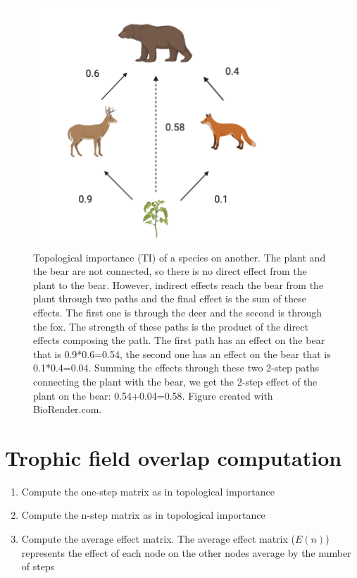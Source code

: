 \documentclass[twocolumn]{article}
\begin{document}
\begin{appendices}
\begin{enumerate}
								\begin{figure}[htbp]%
									\centering
									\includegraphics[width=1.0\linewidth]{TI_example.png}
									\caption{Topological importance (TI) of a species on another. The plant and the bear are not connected, so there is no direct effect from the plant to the bear. However, indirect effects reach the bear from the plant through two paths and the final effect is the sum of these effects. The first one is through the deer and the second is through the fox. The strength of these paths is the product of the direct effects composing the path. The first path has an effect on the bear that is 0.9*0.6=0.54, the second one has an effect on the bear that is 0.1*0.4=0.04. Summing the effects through these two 2-step paths connecting the plant with the bear, we get the 2-step effect of the plant on the bear: 0.54+0.04=0.58. Figure created with BioRender.com.} \label{fig:TI}
								\end{figure}

		\end{enumerate}

	\section{Trophic field overlap computation} \label{appendix:TO}

		\begin{enumerate}
			\item Compute the one-step matrix as in topological importance \item Compute the n-step matrix as in topological importance \item Compute the average effect matrix. The average effect matrix ($E(n)$) represents the effect of each node on the other nodes average by the number of steps


\end{enumerate}
\end{appendices}
\end{document}
